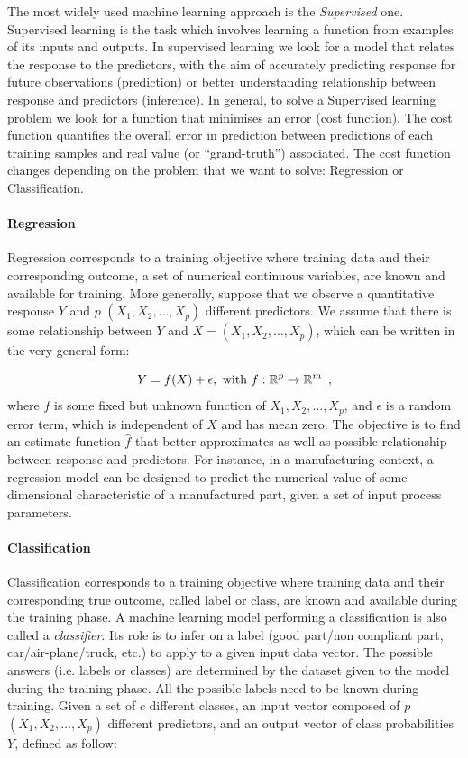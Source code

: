 The most widely used machine learning approach is the \textit{Supervised} one. Supervised learning is the task which involves learning a function from examples of its inputs and outputs. In supervised learning we look for a model that relates the response to the predictors, with the aim of accurately predicting response for future observations (prediction) or better understanding relationship between response and predictors (inference). In general, to solve a Supervised learning problem we look for a function that minimises an error (cost function). The cost function quantifies the overall error in prediction between predictions of each training samples and real value (or “grand-truth”) associated. The cost function changes depending on the problem that we want to solve: Regression or Classification.

\paragraph{Regression} \label{Regression}

Regression corresponds to a training objective where training data and their corresponding outcome, a set of numerical continuous variables, are known and available for training. More generally, suppose that we observe a quantitative response $Y$ and $p$ $(X_1,X_2,\ldots,X_p)$ different predictors. We assume that there is some relationship between $Y$ and $X = (X_1,X_2,\ldots,X_p)$, which can be written in the very general form: 

\begin{equation}
  Y=f(X) + \epsilon, \textnormal{ with } f:\mathbb{R}^{p} \rightarrow \mathbb{R}^{m}
  \enspace,
\end{equation}
where $f$ is some fixed but unknown function of $X_1,X_2,\ldots,X_p$, and $\epsilon$ is a random error term, which is independent of $X$ and has mean zero. The objective is to find an estimate function $\hat{f}$ that better approximates as well as possible relationship between response and predictors. For instance, in a manufacturing context, a regression model can be designed to predict the numerical value of some dimensional characteristic of a manufactured part, given a set of input process parameters.

\paragraph{Classification} \label{Classification}

Classification corresponds to a training objective where training data and their corresponding true outcome, called label or class, are known and available during the training phase. A machine learning model performing a classification is also called a \textit{classifier}. Its role is to infer on a label (good part/non compliant part, car/air-plane/truck, etc.) to apply to a given input data vector. The possible answers (i.e. labels or classes) are determined by the dataset given to the model during the training phase. All the possible labels need to be known during training. Given a set of $c$ different classes, an input vector composed of $p$ $(X_1,X_2,\ldots,X_p)$ different predictors, and an output vector of class probabilities $Y$, defined as follow:

